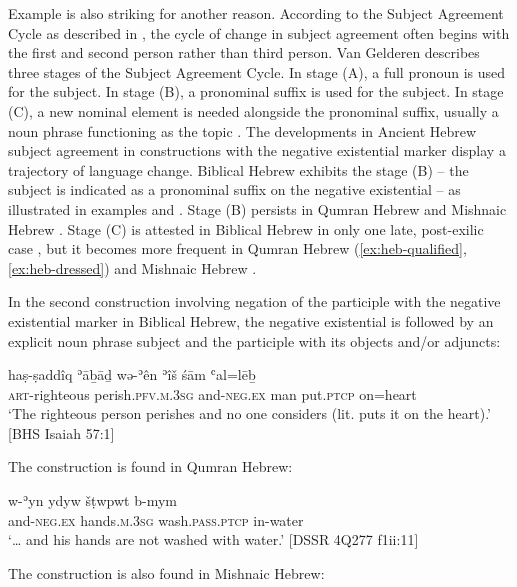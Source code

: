\documentclass[output=paper,colorlinks,citecolor=brown,draft,draftmode]{langscibook}
\begin{document}
Example  is also striking for another reason. According to
the Subject Agreement Cycle as described in \citet[41]{Gelderen2011},
the cycle of change in subject agreement often begins with the
first and second person rather than
third person. Van Gelderen describes three stages of the
Subject Agreement Cycle. In stage (A), a full pronoun is used for the
subject. In stage (B), a pronominal suffix is used for the subject. In
stage (C), a new nominal element is needed alongside the pronominal suffix,
usually a noun phrase functioning as the topic 
\parencite[41]{Gelderen2011}. The developments in Ancient Hebrew subject
agreement in constructions with the negative existential marker display a
trajectory of language change. Biblical Hebrew exhibits the stage (B) – the
subject is indicated as a pronominal suffix on the negative existential –
as illustrated in examples  and . Stage (B)
persists in Qumran Hebrew  and Mishnaic Hebrew
.
Stage (C) is attested in Biblical Hebrew in only one late, post-exilic case
, but it becomes more frequent in Qumran Hebrew
(\ref{ex:heb-qualified}, \ref{ex:heb-dressed}) and Mishnaic Hebrew
. 

In the second construction involving negation of the participle with the
negative existential marker in Biblical Hebrew, the negative existential is
followed by an explicit noun phrase subject and the participle with its
objects and\slash or adjuncts:
%
\begin{exe}\ex \label{ex:heb-righteous}
    \gll haṣ-ṣaddîq ʾāḇāḏ wə-ʾên ʾîš śām      ʿal=lēḇ \\
\textsc{art}-righteous perish.\textsc{pfv.m.3sg}   and-\textsc{neg.ex}   man put.\textsc{ptcp} on=heart \\
    \glt `The righteous person perishes and no one considers (lit. puts it     on the heart).' [BHS Isaiah 57:1]
    \end{exe}
%
The construction is found in Qumran Hebrew:
%
\begin{exe}\ex \label{ex:heb-hands}
    \gll w-ʾ{\cb}yn yd{\ob}yw{\cb} šṭ{\ob}w{\cb}pwt b-mym\footnotemark{} \\
  and-\textsc{neg.ex}   hands.\textsc{m.3sg}   wash.\textsc{pass.ptcp} in-water \\
    \glt `\ldots{} and his hands are not washed with water.'
[DSSR 4Q277 f1ii:11]
    \end{exe}
%
The construction is also found in Mishnaic Hebrew:
%
\end{document}
